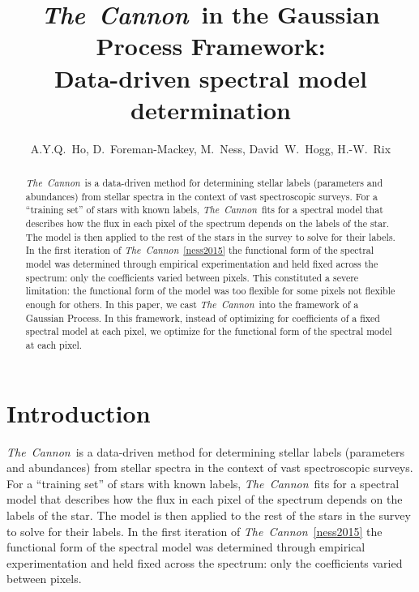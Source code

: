 \documentclass[12pt, preprint]{aastex}
\newcommand{\tc}{\textsl{The~Cannon}}
\begin{document}
\title{\tc\ in the Gaussian Process Framework: \\ Data-driven spectral
model determination}
\author{A.Y.Q.~Ho,
D.~Foreman-Mackey,
M.~Ness,
David~W.~Hogg, 
H.-W.~Rix
}


\begin{abstract}

\tc\ is a data-driven method for determining stellar labels (parameters and 
abundances) from stellar spectra in the context of vast spectroscopic surveys. 
For a ``training set'' of stars with known labels, \tc\ fits for a spectral 
model that describes how the flux in each pixel of the spectrum depends on the 
labels of the star. The model is then applied to the rest of the stars in the 
survey to solve for their labels. 
In the first iteration of \tc\ \ref{ness2015} the functional form of the 
spectral model was determined through empirical experimentation and held fixed
across the spectrum: only the coefficients varied between pixels. 
This constituted a severe limitation: the functional form of the model was too 
flexible for some pixels 
not flexible enough for others. In this paper, we cast \tc\ into the framework
of a Gaussian Process. In this framework, instead of optimizing for 
coefficients of a fixed spectral model at each pixel, we optimize for the
functional form of the spectral model at each pixel. 

\end{abstract}


\section{Introduction}

\tc\ is a data-driven method for determining stellar labels (parameters and 
abundances) from stellar spectra in the context of vast spectroscopic surveys. 
For a ``training set'' of stars with known labels, \tc\ fits for a spectral 
model that describes how the flux in each pixel of the spectrum depends on the 
labels of the star. The model is then applied to the rest of the stars in the 
survey to solve for their labels. 
In the first iteration of \tc\ \ref{ness2015} the functional form of the 
spectral model was determined through empirical experimentation and held fixed
across the spectrum: only the coefficients varied between pixels. 
\end{document}
